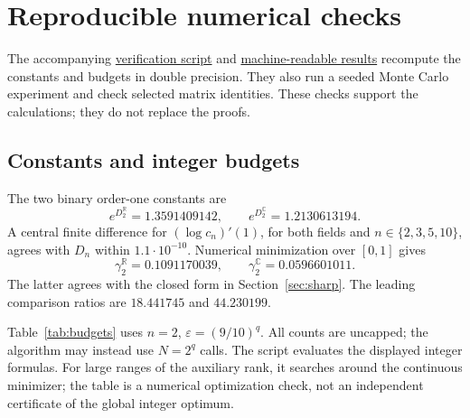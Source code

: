 \documentclass[11pt,a4paper]{article}
\theoremstyle{definition}\newtheorem{definition}[theorem]{Definition}
\theoremstyle{remark}\newtheorem{remark}[theorem]{Remark}
\numberwithin{equation}{section}
\newcommand{\R}{\mathbb R}
\newcommand{\C}{\mathbb C}
\newcommand{\eps}{\varepsilon}
\begin{document}
\section{Reproducible numerical checks}\label{sec:numerics}
The accompanying
\href{https://github.com/DiarHaidary/Results/blob/main/manuscripts/02-Product-Probe-Drift/verify_numerics.py}{verification script}
and
\href{https://github.com/DiarHaidary/Results/blob/main/manuscripts/02-Product-Probe-Drift/verification_results.json}{machine-readable results}
recompute the constants and budgets in double precision.
They also run a seeded Monte Carlo experiment and check selected matrix
identities. These checks support the calculations; they do not replace
the proofs.

\subsection{Constants and integer budgets}
The two binary order-one constants are
\[
 e^{D_2^{\R}}=1.3591409142,\qquad
 e^{D_2^{\C}}=1.2130613194.
\]
A central finite difference for \((\log c_n)'(1)\), for both fields and
\(n\in\{2,3,5,10\}\), agrees with \(D_n\) within \(1.1\cdot10^{-10}\).
Numerical minimization over \([0,1]\) gives
\[
 \gamma_2^{\R}=0.1091170039,\qquad
 \gamma_2^{\C}=0.0596601011.
\]
The latter agrees with the closed form in Section~\ref{sec:sharp}.
The leading comparison ratios are \(18.441745\) and \(44.230199\).

Table~\ref{tab:budgets} uses \(n=2\), \(\eps=(9/10)^q\).
All counts are uncapped; the algorithm may instead use \(N=2^q\) calls.
The script evaluates the displayed integer formulas. For large ranges
of the auxiliary rank, it searches around the continuous minimizer;
the table is a numerical optimization check, not an independent
certificate of the global integer optimum.
\end{document}
